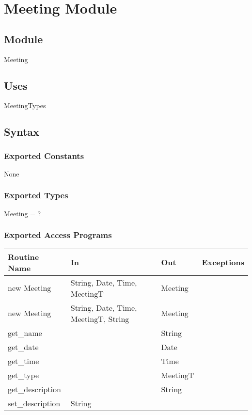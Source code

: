 \documentclass[12pt, titlepage]{article}
\begin{document}
\newpage

\section* {Meeting Module}

\subsection*{Module}
Meeting

\subsection* {Uses}
MeetingTypes

\subsection* {Syntax}
\subsubsection* {Exported Constants}
None

\subsubsection* {Exported Types}
Meeting = ?

\subsubsection* {Exported Access Programs}
\begin{tabular}{|l|l|l|l|}
    \hline
    \textbf{Routine Name} & \textbf{In} & \textbf{Out} & \textbf{Exceptions} \\
    \hline
    new Meeting & String, Date, Time, MeetingT & Meeting & \\
    \hline
    new Meeting & String, Date, Time, MeetingT, String & Meeting & \\
    \hline
    get\_name & & String &\\
    \hline
    get\_date & & Date &\\
    \hline
    get\_time & & Time &\\
    \hline
    get\_type & & MeetingT &\\
    \hline
    get\_description & & String &\\
    \hline
    set\_description & String & & \\
    \hline
\end{tabular}
\end{document}
